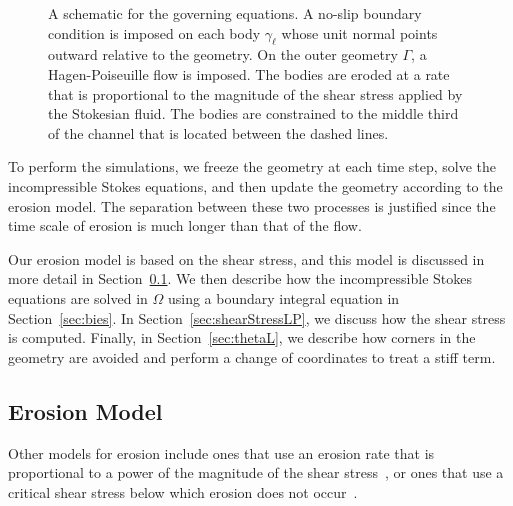 \documentclass[preprint, 10pt]{elsarticle}
\begin{document}
\begin{figure}[htpb]
  \centering
  
  \caption{\label{fig:schematic} A schematic for the governing
    equations.  A no-slip boundary condition is imposed on each body
    $\gamma_\ell$ whose unit normal points outward relative to the
    geometry.  On the outer geometry $\Gamma$, a Hagen-Poiseuille flow
    is imposed.  The bodies are eroded at a rate that is proportional to
    the magnitude of the shear stress applied by the Stokesian fluid.
    The bodies are constrained to the middle third of the channel that
    is located between the dashed lines.}
\end{figure}

To perform the simulations, we freeze the geometry at each time step,
solve the incompressible Stokes equations, and then update the geometry
according to the erosion model.  The separation between these two
processes is justified since the time scale of erosion is much longer
than that of the flow.


Our erosion model is based on the shear stress, and this model is
discussed in more detail in Section~\ref{sec:erosion}.  We then describe
how the incompressible Stokes equations are solved in $\Omega$ using a
boundary integral equation in Section~\ref{sec:bies}.  In
Section~\ref{sec:shearStressLP}, we discuss how the shear stress is
computed.  Finally, in Section~\ref{sec:thetaL}, we describe how corners
in the geometry are avoided and perform a change of coordinates to treat a stiff term.


\subsection{Erosion Model} 
\label{sec:erosion}

Other models for erosion include ones that use an erosion rate that is
proportional to a power of the magnitude of the shear
stress~\cite{par-izu2000}, or ones that use a critical shear stress
below which erosion does not occur~\cite{lag2000}.
\end{document}
